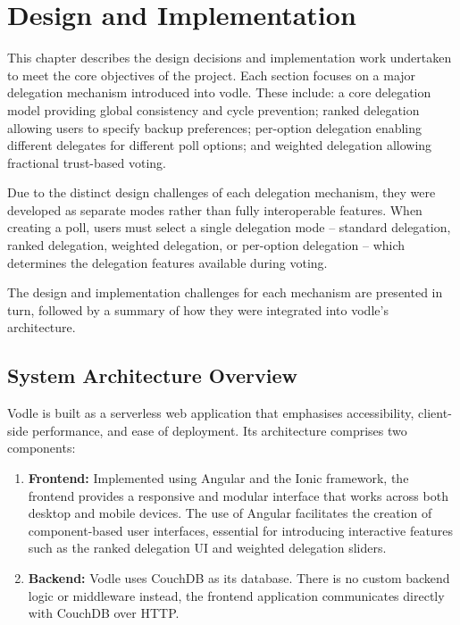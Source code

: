 \chapter{Design and Implementation}
\label{ch:design_implementation}
This chapter describes the design decisions and implementation work undertaken to meet the core objectives of the project.
Each section focuses on a major delegation mechanism introduced into vodle. These include: a core delegation model providing global consistency and cycle prevention; ranked delegation allowing users to specify backup preferences; per-option delegation enabling different delegates for different poll options; and weighted delegation allowing fractional trust-based voting.

Due to the distinct design challenges of each delegation mechanism, they were developed as separate modes rather than fully interoperable features. When creating a poll, users must select a single delegation mode -- standard delegation, ranked delegation, weighted delegation, or per-option delegation -- which determines the delegation features available during voting.

The design and implementation challenges for each mechanism are presented in turn, followed by a summary of how they were integrated into vodle's architecture.

\section{System Architecture Overview}\label{sec:design_architecture}
Vodle is built as a serverless web application that emphasises accessibility, client-side performance, and ease of deployment. Its architecture comprises two components:

\begin{enumerate}
  \item \textbf{Frontend:} Implemented using Angular and the Ionic framework, the frontend provides a responsive and modular interface that works across both desktop and mobile devices. The use of Angular facilitates the creation of component-based user interfaces, essential for introducing interactive features such as the ranked delegation UI and weighted delegation sliders.
  \item \textbf{Backend:} Vodle uses CouchDB as its database. There is no custom backend logic or middleware
  instead, the frontend application communicates directly with CouchDB over HTTP.
\end{enumerate}

